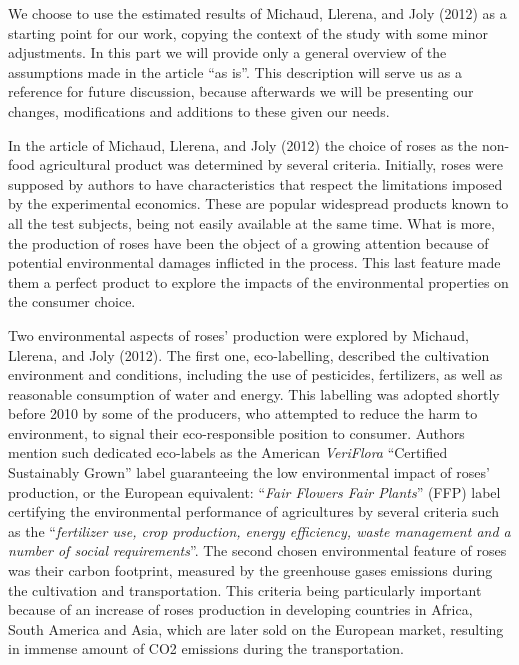 \documentclass[12pt,]{article}
\begin{document}
We choose to use the estimated results of Michaud, Llerena, and Joly
(2012) as a starting point for our work, copying the context of the
study with some minor adjustments. In this part we will provide only a
general overview of the assumptions made in the article ``as is''. This
description will serve us as a reference for future discussion, because
afterwards we will be presenting our changes, modifications and
additions to these given our needs.

In the article of Michaud, Llerena, and Joly (2012) the choice of roses
as the non-food agricultural product was determined by several criteria.
Initially, roses were supposed by authors to have characteristics that
respect the limitations imposed by the experimental economics. These are
popular widespread products known to all the test subjects, being not
easily available at the same time. What is more, the production of roses
have been the object of a growing attention because of potential
environmental damages inflicted in the process. This last feature made
them a perfect product to explore the impacts of the environmental
properties on the consumer choice.

Two environmental aspects of roses' production were explored by Michaud,
Llerena, and Joly (2012). The first one, eco-labelling, described the
cultivation environment and conditions, including the use of pesticides,
fertilizers, as well as reasonable consumption of water and energy. This
labelling was adopted shortly before 2010 by some of the producers, who
attempted to reduce the harm to environment, to signal their
eco-responsible position to consumer. Authors mention such dedicated
eco-labels as the American \emph{VeriFlora} ``Certified Sustainably
Grown'' label guaranteeing the low environmental impact of roses'
production, or the European equivalent: ``\emph{Fair Flowers Fair
Plants}'' (FFP) label certifying the environmental performance of
agricultures by several criteria such as the ``\emph{fertilizer use,
crop production, energy efficiency, waste management and a number of
social requirements}''. The second chosen environmental feature of roses
was their carbon footprint, measured by the greenhouse gases emissions
during the cultivation and transportation. This criteria being
particularly important because of an increase of roses production in
developing countries in Africa, South America and Asia, which are later
sold on the European market, resulting in immense amount of CO2
emissions during the transportation.
\end{document}
